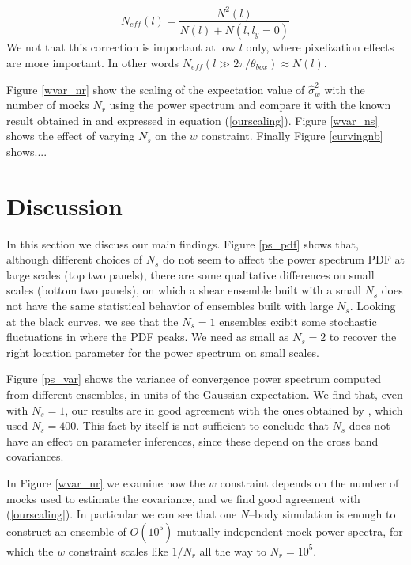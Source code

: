 \documentclass[reprint,aps,prd,superscriptaddress,showkeys,showpacs]{revtex4-1}
\newcommand{\h}[1]{\hat{#1}}
\begin{document}
\begin{equation}
N_{eff}(l) = \frac{N^2(l)}{N(l)+N(l,l_y=0)}
\end{equation}
%
We not that this correction is important at low $l$ only, where pixelization effects are more important. In other words $N_{eff}(l\gg2\pi/\theta_{box})\approx N(l)$. 

Figure \ref{wvar_nr} show the scaling of the expectation value of $\h{\sigma}_w^2$ with the number of mocks $N_r$ using the power spectrum and compare it with the known result obtained in \citep{DodelsonSchneider13} and expressed in equation (\ref{ourscaling}). Figure \ref{wvar_ns} shows the effect of varying $N_s$ on the $w$ constraint. Finally Figure \ref{curvingnb} shows.... 


\section{Discussion}

In this section we discuss our main findings. Figure \ref{ps_pdf} shows that, although different choices of $N_s$ do not seem to affect the power spectrum PDF at large scales (top two panels), there are some qualitative differences on small scales (bottom two panels), on which a shear ensemble built with a small $N_s$ does not have the same statistical behavior of ensembles built with large $N_s$. Looking at the black curves, we see that the $N_s=1$ ensembles exibit some stochastic fluctuations in where the PDF peaks. We need as small as $N_s=2$ to recover the right location parameter for the power spectrum on small scales. 

Figure \ref{ps_var} shows the variance of convergence power spectrum computed from different ensembles, in units of the Gaussian expectation. We find that, even with $N_s=1$, our results are in good agreement with the ones obtained by \citep{Sato12}, which used $N_s=400$. This fact by itself is not sufficient to conclude that $N_s$ does not have an effect on parameter inferences, since these depend on the cross band covariances. 

In Figure \ref{wvar_nr} we examine how the $w$ constraint depends on the number of mocks used to estimate the covariance, and we find good agreement with (\ref{ourscaling}). In particular we can see that one $N$--body simulation is enough to construct an ensemble of $O(10^5)$ mutually independent mock power spectra, for which the $w$ constraint scales like $1/N_r$ all the way to $N_r=10^5$.    
\end{document}
